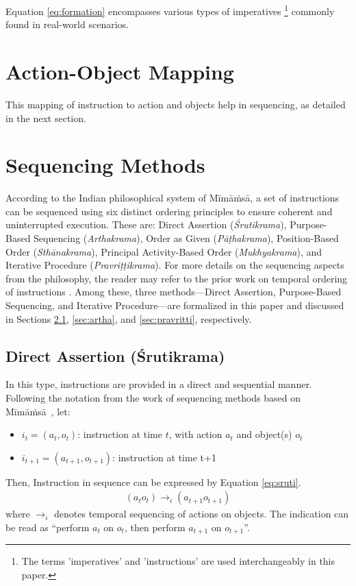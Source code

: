 \documentclass[a4paper,11pt]{lmcs}
\newcommand{\mimamsa}{M\={i}m\={a}\.ms\={a}}
\begin{document}
Equation \ref{eq:formation} encompasses various types of imperatives \footnote{The terms 'imperatives' and 'instructions' are used interchangeably in this paper.} commonly found in real-world scenarios.


\section{Action-Object Mapping}
\label{sec:class}

\medskip
\noindent

This mapping of instruction to action and objects help in sequencing, as detailed in the next section.

\section{Sequencing Methods}
\label{sec:seq}
According to the Indian philosophical system of \mimamsa, a set of instructions can be sequenced using six distinct ordering principles to ensure coherent and uninterrupted execution. These are: Direct Assertion (\textit{Śrutikrama}), Purpose-Based Sequencing (\textit{Arthakrama}), Order as Given (\textit{P\={a}\d{t}hakrama}), Position-Based Order (\textit{Sth\={a}nakrama}), Principal Activity-Based Order (\textit{Mukhyakrama}), and Iterative Procedure (\textit{Pravri\d{t}\d{t}ikrama}). For more details on the sequencing aspects from the philosophy, the reader may refer to the prior work on temporal ordering of instructions \cite{llm_mira}. Among these, three methods—Direct Assertion, Purpose-Based Sequencing, and Iterative Procedure—are formalized in this paper and discussed in Sections \ref{sec:sruti}, \ref{sec:artha}, and \ref{sec:pravritti}, respectively.


\subsection{Direct Assertion (\'{S}rutikrama)}
\label{sec:sruti}
In this type, instructions are provided in a direct and sequential manner. Following the notation from the work of sequencing methods based on \mimamsa~\cite{llm_mira}, let:
\begin{itemize}
 \item $i_t = (a_t,o_t)$: instruction at time $t$, with action $a_t$ and object(s) $o_t$
\item $i_{t+1} = (a_{t+1},o_{t+1})$: instruction at time t+1
 \end{itemize}
Then, Instruction in sequence can be expressed by Equation \ref{eq:sruti}.
\begin{eqnarray}
\label{eq:sruti}
 (a_t o_t) \rightarrow_i (a_{t+1}o_{t+1})
\end{eqnarray}
where $\rightarrow_i$ denotes temporal sequencing of actions on objects. The indication can be read as  ``perform $a_t$ on $o_t$, then perform $a_{t+1}$ on $o_{t+1}$''.
\end{document}
